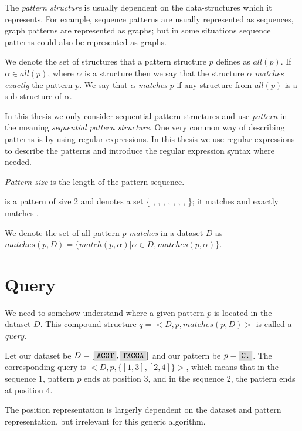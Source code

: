 The \emph{pattern structure} is usually dependent on the data-structures which it represents. For example, sequence patterns are usually represented as sequences, graph patterns are represented as graphs; but in some situations sequence patterns could also be represented as graphs.

We denote the set of structures that a pattern structure $p$ defines as $all(p)$. If $\alpha \in all(p)$, where $\alpha$ is a structure then we say that the structure $\alpha$ \emph{matches exactly} the pattern $p$. We say that $\alpha$ \emph{matches} $p$ if any structure from $all(p)$ is a sub-structure of $\alpha$.

In this thesis we only consider sequential pattern structures and use \emph{pattern} in the meaning \emph{sequential pattern structure}. One very common way of describing patterns is by using regular expressions\cite{KleeneRegularSets,RegularExpressions}. In this thesis we use regular expressions to describe the patterns and introduce the regular expression syntax where needed.

\emph{Pattern size} is the length of the pattern sequence.

\begin{exmp}
 is a pattern of size 2 and denotes a set 
\{ , , , , , , , \}; it matches  and exactly matches .	
\end{exmp}

We denote the set of all pattern $p$ \emph{matches} in a dataset $D$ as $matches(p, D) = \{ match(p, \alpha) | \alpha \in D, matches(p, \alpha) \}$.

\section{Query}

We need to somehow understand where a given pattern $p$ is located in the dataset $D$. This compound structure $q = <D, p, matches(p, D)>$ is called a \emph{query}.

\begin{exmp}
Let our dataset be $D = [ \text{\R{ACGT}}, \text{\R{TXCGA}} ]$ and our pattern be $p = \text{\R{C.}}$. The corresponding query is $<D, p, \{ [1,3], [2,4]\}>$, which means that in the sequence 1, pattern $p$ ends at position 3, and in the sequence 2, the pattern ends at position 4.
\end{exmp}

The position representation is largerly dependent on the dataset and pattern representation, but irrelevant for this generic algorithm.

